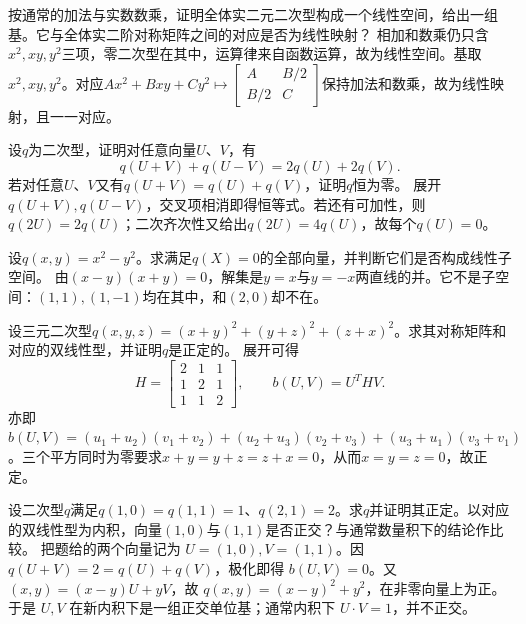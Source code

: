 按通常的加法与实数数乘，证明全体实二元二次型构成一个线性空间，给出一组基。它与全体实二阶对称矩阵之间的对应是否为线性映射？
\solutionanswer
相加和数乘仍只含\(x^2,xy,y^2\)三项，零二次型在其中，运算律来自函数运算，故为线性空间。基取\(x^2,xy,y^2\)。对应\(Ax^2+Bxy+Cy^2\mapsto\begin{bmatrix}A&B/2\\B/2&C\end{bmatrix}\)保持加法和数乘，故为线性映射，且一一对应。


设\(q\)为二次型，证明对任意向量\(U\)、\(V\)，有
\begin{equation*}
    q(U+V)+q(U-V)=2q(U)+2q(V) .
\end{equation*}
若对任意\(U\)、\(V\)又有\(q(U+V)=q(U)+q(V)\)，证明\(q\)恒为零。
\solutionanswer
展开\(q(U+V),q(U-V)\)，交叉项相消即得恒等式。若还有可加性，则\(q(2U)=2q(U)\)；二次齐次性又给出\(q(2U)=4q(U)\)，故每个\(q(U)=0\)。


设\(q(x,y)=x^{2}-y^{2}\)。求满足\(q(X)=0\)的全部向量，并判断它们是否构成线性子空间。
\solutionanswer
由\((x-y)(x+y)=0\)，解集是\(y=x\)与\(y=-x\)两直线的并。它不是子空间：\((1,1),(1,-1)\)均在其中，和\((2,0)\)却不在。


设三元二次型\(q(x,y,z)=(x+y)^{2}+(y+z)^{2}+(z+x)^{2}\)。求其对称矩阵和对应的双线性型，并证明\(q\)是正定的。
\solutionanswer
展开可得
\[
H=\begin{bmatrix}2&1&1\\1&2&1\\1&1&2\end{bmatrix},\qquad b(U,V)=U^THV.
\]
亦即\(b(U,V)=(u_1+u_2)(v_1+v_2)+(u_2+u_3)(v_2+v_3)+(u_3+u_1)(v_3+v_1)\)。三个平方同时为零要求\(x+y=y+z=z+x=0\)，从而\(x=y=z=0\)，故正定。


设二次型\(q\)满足\(q(1,0)=q(1,1)=1\)、\(q(2,1)=2\)。求\(q\)并证明其正定。以对应的双线性型为内积，向量\((1,0)\)与\((1,1)\)是否正交？与通常数量积下的结论作比较。
\solutionanswer
把题给的两个向量记为 \(U=(1,0),V=(1,1)\)。因 \(q(U+V)=2=q(U)+q(V)\)，极化即得 \(b(U,V)=0\)。又 \((x,y)=(x-y)U+yV\)，故 \(q(x,y)=(x-y)^2+y^2\)，在非零向量上为正。于是 \(U,V\) 在新内积下是一组正交单位基；通常内积下 \(U\cdot V=1\)，并不正交。


